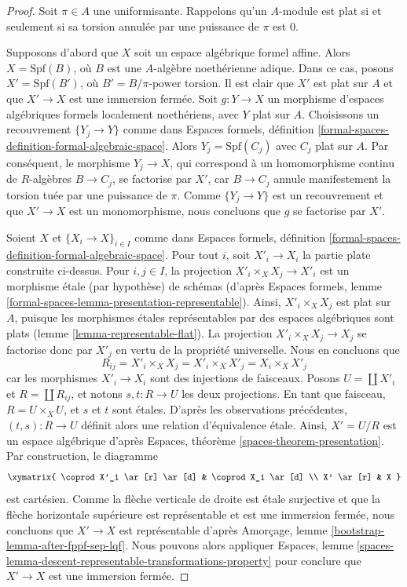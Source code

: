 \begin{proof}
Soit $\pi \in A$ une uniformisante. Rappelons qu'un $A$-module
est plat si et seulement si sa torsion annulée par une puissance de $\pi$ est $0$.

\medskip\noindent
Supposons d'abord que $X$ soit un espace algébrique formel affine.
Alors $X = \text{Spf}(B)$, où $B$ est une $A$-algèbre noethérienne adique.
Dans ce cas, posons $X' = \text{Spf}(B')$, où
$B' = B/\pi\text{-power torsion}$. Il est clair que $X'$ est plat
sur $A$ et que $X' \to X$ est une immersion fermée.
Soit $g : Y \to X$ un morphisme d'espaces algébriques formels localement
noethériens, avec $Y$ plat sur $A$. Choisissons un recouvrement
$\{Y_j \to Y\}$ comme dans Espaces formels, définition
\ref{formal-spaces-definition-formal-algebraic-space}.
Alors $Y_j = \text{Spf}(C_j)$ avec $C_j$ plat sur $A$.
Par conséquent, le morphisme $Y_j \to X$, qui correspond à un homomorphisme
continu de $R$-algèbres $B \to C_j$, se factorise par $X'$, car
$B \to C_j$ annule manifestement la torsion tuée par une puissance de $\pi$.
Comme $\{Y_j \to Y\}$ est un recouvrement et que $X' \to X$
est un monomorphisme, nous concluons que $g$ se factorise par $X'$.

\medskip\noindent
Soient $X$ et $\{X_i \to X\}_{i \in I}$ comme dans
Espaces formels, définition
\ref{formal-spaces-definition-formal-algebraic-space}.
Pour tout $i$, soit $X'_i \to X_i$ la partie plate construite
ci-dessus. Pour $i, j \in I$, la projection
$X'_i \times_X X_j \to X'_i$ est un morphisme étale (par hypothèse)
de schémas (d'après Espaces formels, lemme
\ref{formal-spaces-lemma-presentation-representable}).
Ainsi, $X'_i \times_X X_j$ est plat sur $A$, puisque les morphismes
étales représentables par des espaces algébriques sont plats
(lemme \ref{lemma-representable-flat}).
La projection $X'_i \times_X X_j \to X_j$ se factorise donc
par $X'_j$ en vertu de la propriété universelle. Nous en concluons que
$$
R_{ij} = X'_i \times_X X_j = X'_i \times_X X'_j = X_i \times_X X'_j
$$
car les morphismes $X'_i \to X_i$ sont des injections de faisceaux.
Posons $U = \coprod X'_i$ et
$R = \coprod R_{ij}$, et notons $s, t : R \to U$ les deux
projections. En tant que faisceau, $R = U \times_X U$, et $s$ et $t$
sont étales. D'après les observations précédentes, $(t, s) : R \to U$
définit alors une relation d'équivalence étale. Ainsi, $X' = U/R$ est un
espace algébrique d'après Espaces, théorème \ref{spaces-theorem-presentation}.
Par construction, le diagramme
$$
\xymatrix{
\coprod X'_i \ar[r] \ar[d] & \coprod X_i \ar[d] \\
X' \ar[r] & X
}
$$
est cartésien. Comme la flèche verticale de droite est étale surjective
et que la flèche horizontale supérieure est représentable et est une immersion
fermée, nous concluons que $X' \to X$ est représentable d'après
Amorçage, lemme \ref{bootstrap-lemma-after-fppf-sep-lqf}.
Nous pouvons alors appliquer Espaces, lemme
\ref{spaces-lemma-descent-representable-transformations-property}
pour conclure que $X' \to X$ est une immersion fermée.


\end{proof}
